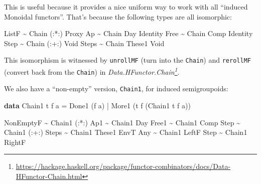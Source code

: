 \documentclass[]{article}
\newenvironment{Shaded}{}{}
\newcommand{\DataTypeTok}[1]{\textcolor[rgb]{0.56,0.13,0.00}{#1}}
\newcommand{\KeywordTok}[1]{\textcolor[rgb]{0.00,0.44,0.13}{\textbf{#1}}}
\newcommand{\NormalTok}[1]{#1}
\newcommand{\OperatorTok}[1]{\textcolor[rgb]{0.40,0.40,0.40}{#1}}
\newcommand{\OtherTok}[1]{\textcolor[rgb]{0.00,0.44,0.13}{#1}}
\renewcommand{\href}[2]{#2\footnote{\url{#1}}}
\begin{document}
\begin{itemize}
  This is useful because it provides a nice uniform way to work with all
  ``induced Monoidal functors''. That's because the following types are all
  isomorphic:

\begin{Shaded}
\begin{Highlighting}[]
\DataTypeTok{ListF} \OperatorTok{\textasciitilde{}} \DataTypeTok{Chain}\NormalTok{ (}\OperatorTok{:*:}\NormalTok{)  }\DataTypeTok{Proxy}
\DataTypeTok{Ap}    \OperatorTok{\textasciitilde{}} \DataTypeTok{Chain} \DataTypeTok{Day}    \DataTypeTok{Identity}
\DataTypeTok{Free}  \OperatorTok{\textasciitilde{}} \DataTypeTok{Chain} \DataTypeTok{Comp}   \DataTypeTok{Identity}
\DataTypeTok{Step}  \OperatorTok{\textasciitilde{}} \DataTypeTok{Chain}\NormalTok{ (}\OperatorTok{:+:}\NormalTok{)  }\DataTypeTok{Void}
\DataTypeTok{Steps} \OperatorTok{\textasciitilde{}} \DataTypeTok{Chain} \DataTypeTok{These1} \DataTypeTok{Void}
\end{Highlighting}
\end{Shaded}

  This isomorphism is witnessed by \texttt{unrollMF} (turn into the
  \texttt{Chain}) and \texttt{rerollMF} (convert back from the \texttt{Chain})
  in
  \emph{\href{https://hackage.haskell.org/package/functor-combinators/docs/Data-HFunctor-Chain.html}{Data.HFunctor.Chain}}.

  We also have a ``non-empty'' version, \texttt{Chain1}, for induced
  semigroupoids:

\begin{Shaded}
\begin{Highlighting}[]
\KeywordTok{data} \DataTypeTok{Chain1}\NormalTok{ t f a }\OtherTok{=} \DataTypeTok{Done1}\NormalTok{ (f a)}
                  \OperatorTok{|} \DataTypeTok{More1}\NormalTok{ (t f (}\DataTypeTok{Chain1}\NormalTok{ t f a))}
\end{Highlighting}
\end{Shaded}

\begin{Shaded}
\begin{Highlighting}[]
\DataTypeTok{NonEmptyF} \OperatorTok{\textasciitilde{}} \DataTypeTok{Chain1}\NormalTok{ (}\OperatorTok{:*:}\NormalTok{)}
\DataTypeTok{Ap1}       \OperatorTok{\textasciitilde{}} \DataTypeTok{Chain1} \DataTypeTok{Day}
\DataTypeTok{Free1}     \OperatorTok{\textasciitilde{}} \DataTypeTok{Chain1} \DataTypeTok{Comp}
\DataTypeTok{Step}      \OperatorTok{\textasciitilde{}} \DataTypeTok{Chain1}\NormalTok{ (}\OperatorTok{:+:}\NormalTok{)}
\DataTypeTok{Steps}     \OperatorTok{\textasciitilde{}} \DataTypeTok{Chain1} \DataTypeTok{These1}
\DataTypeTok{EnvT} \DataTypeTok{Any}  \OperatorTok{\textasciitilde{}} \DataTypeTok{Chain1} \DataTypeTok{LeftF}
\DataTypeTok{Step}      \OperatorTok{\textasciitilde{}} \DataTypeTok{Chain1} \DataTypeTok{RightF}
\end{Highlighting}
\end{Shaded}


\end{itemize}
\end{document}
